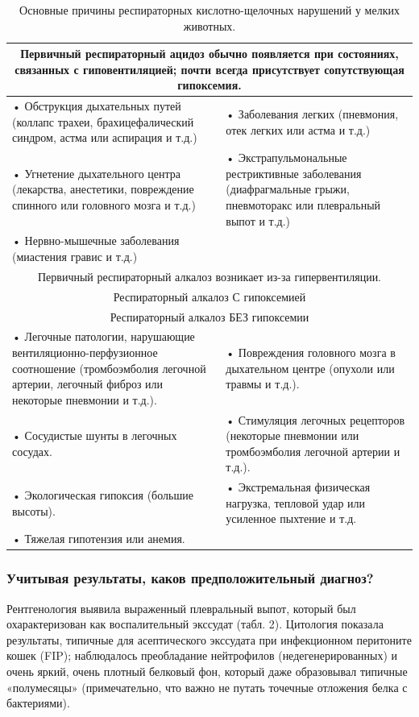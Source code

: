 \documentclass[a4paper,12pt]{book}
\begin{document}
\begin{table}[htbp]
\centering
\caption{Основные причины респираторных кислотно-щелочных нарушений у мелких животных.}
\begin{tabular}{p{7cm}p{7cm}}
\toprule
\multicolumn{2}{c}{Первичный респираторный ацидоз обычно появляется при состояниях, связанных с гиповентиляцией; почти всегда присутствует сопутствующая гипоксемия.} \\
\midrule
• Обструкция дыхательных путей (коллапс трахеи, брахицефалический синдром, астма или аспирация и т.д.) & • Заболевания легких (пневмония, отек легких или астма и т.д.) \\
• Угнетение дыхательного центра (лекарства, анестетики, повреждение спинного или головного мозга и т.д.) & • Экстрапульмональные рестриктивные заболевания (диафрагмальные грыжи, пневмоторакс или плевральный выпот и т.д.) \\
• Нервно-мышечные заболевания (миастения гравис и т.д.) & \\
\midrule
\multicolumn{2}{c}{Первичный респираторный алкалоз возникает из-за гипервентиляции.} \\
\multicolumn{2}{c}{Респираторный алкалоз С гипоксемией} \\
\multicolumn{2}{c}{Респираторный алкалоз БЕЗ гипоксемии} \\
• Легочные патологии, нарушающие вентиляционно-перфузионное соотношение (тромбоэмболия легочной артерии, легочный фиброз или некоторые пневмонии и т.д.). & • Повреждения головного мозга в дыхательном центре (опухоли или травмы и т.д.). \\
• Сосудистые шунты в легочных сосудах. & • Стимуляция легочных рецепторов (некоторые пневмонии или тромбоэмболия легочной артерии и т.д.). \\
• Экологическая гипоксия (большие высоты). & • Экстремальная физическая нагрузка, тепловой удар или усиленное пыхтение и т.д. \\
• Тяжелая гипотензия или анемия. & \\
\bottomrule
\end{tabular}
\end{table}

\subsubsection*{Учитывая результаты, каков предположительный диагноз?}
Рентгенология выявила выраженный плевральный выпот, который был охарактеризован как воспалительный экссудат (табл. 2). Цитология показала результаты, типичные для асептического экссудата при инфекционном перитоните кошек (FIP); наблюдалось преобладание нейтрофилов (недегенерированных) и очень яркий, очень плотный белковый фон, который даже образовывал типичные «полумесяцы» (примечательно, что важно не путать точечные отложения белка с бактериями).
\end{document}
